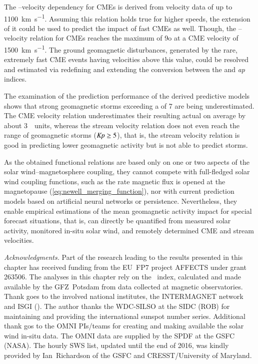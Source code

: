 The \Kp--velocity dependency for CMEs is derived from velocity data of up to \SI{1100}{\km\per\s}. Assuming this relation holds true for higher speeds, the extension of it could be used to predict the \Kp{} impact of fast CMEs as well. Though, the \Kp--velocity relation for CMEs reaches the maximum \Kp{} of 9o at a CME velocity of \SI{1500}{\km\per\s}. The ground geomagnetic disturbances, generated by the rare, extremely fast CME events having velocities above this value, could be resolved and estimated via redefining and extending the conversion between the \Kp{} and \textit{ap} indices.

The examination of the prediction performance of the derived predictive models shows that strong geomagnetic storms exceeding a \Kp{} of 7 are being underestimated. The CME velocity relation underestimates their resulting actual \Kp{} on average by about 3~\Kp~units, whereas the stream velocity relation does not even reach the range of geomagnetic storms ($\text{\textit{Kp}} \geq 5$), that is, the stream velocity relation is good in predicting lower geomagnetic activity but is not able to predict storms.

As the obtained functional relations are based only on one or two aspects of the solar wind--magnetosphere coupling, they cannot compete with full-fledged solar wind coupling functions, such as the rate magnetic flux is opened at the magnetopause (\autoref{eq:newell_merging_function}), nor with current prediction models based on artificial neural networks or \Kp{} persistence. Nevertheless, they enable empirical estimations of the mean geomagnetic activity impact for special forecast situations, that is, \Kp{} can directly be quantified from measured solar activity, monitored in-situ solar wind, and remotely determined CME and stream velocities.



\bigskip
{\small
\noindent \textit{Acknowledgments.} Part of the research leading to the results presented in this chapter has received funding from the EU~FP7 project AFFECTS under grant 263506.
The analyses in this chapter rely on the \Kp~index, calculated and made available by the GFZ~Potsdam from data collected at magnetic observatories. Thank goes to the involved national institutes, the INTERMAGNET network and ISGI (). The author thanks the WDC-SILSO at the SIDC (ROB) for maintaining and providing the international sunspot number series. Additional thank gos to the OMNI PIs/teams for creating and making available the solar wind in-situ data. The OMNI data are supplied by the SPDF at the GSFC (NASA). The hourly SWS list, updated until the end of 2016, was kindly provided by Ian~Richardson of the GSFC and CRESST/University of Maryland.
}

